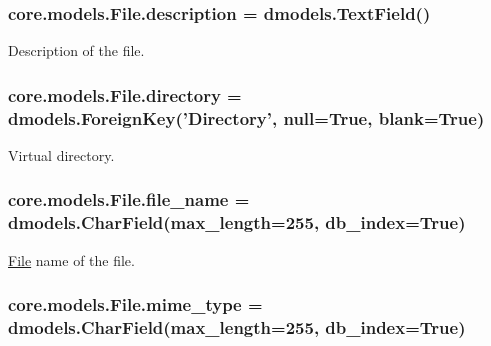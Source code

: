 \hypertarget{classcore_1_1models_1_1File_a3ba747aa055c9952345d32fd0a2e93df}{
\subsubsection[{description}]{\setlength{\rightskip}{0pt plus 5cm}core.\-models.\-File.\-description = dmodels.\-Text\-Field()\hspace{0.3cm}{\ttfamily [static]}}}\label{classcore_1_1models_1_1File_a3ba747aa055c9952345d32fd0a2e93df}


Description of the file. 

\hypertarget{classcore_1_1models_1_1File_a65e05c5c5dee44c2c73d8a202845209f}{
\subsubsection[{directory}]{\setlength{\rightskip}{0pt plus 5cm}core.\-models.\-File.\-directory = dmodels.\-Foreign\-Key('{\bf Directory}', null=True, blank=True)\hspace{0.3cm}{\ttfamily [static]}}}\label{classcore_1_1models_1_1File_a65e05c5c5dee44c2c73d8a202845209f}


Virtual directory. 

\hypertarget{classcore_1_1models_1_1File_a00e09db629f9ff8114662c4e950927bb}{
\subsubsection[{file\-\_\-name}]{\setlength{\rightskip}{0pt plus 5cm}core.\-models.\-File.\-file\-\_\-name = dmodels.\-Char\-Field(max\-\_\-length=255, db\-\_\-index=True)\hspace{0.3cm}{\ttfamily [static]}}}\label{classcore_1_1models_1_1File_a00e09db629f9ff8114662c4e950927bb}


\hyperlink{classcore_1_1models_1_1File}{File} name of the file. 

\hypertarget{classcore_1_1models_1_1File_aedfac4d90aea7deacffb837534bb92bc}{
\subsubsection[{mime\-\_\-type}]{\setlength{\rightskip}{0pt plus 5cm}core.\-models.\-File.\-mime\-\_\-type = dmodels.\-Char\-Field(max\-\_\-length=255, db\-\_\-index=True)\hspace{0.3cm}{\ttfamily [static]}}}\label{classcore_1_1models_1_1File_aedfac4d90aea7deacffb837534bb92bc}


